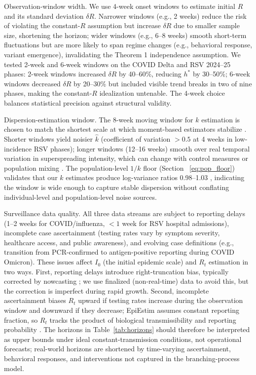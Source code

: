 \documentclass[review]{elsarticle}
\theoremstyle{plain}
\theoremstyle{definition}
\begin{document}
Observation-window width. We use 4-week onset windows to estimate initial $R$ and its standard deviation $\delta R$. Narrower windows (e.g., 2 weeks) reduce the risk of violating the constant-$R$ assumption but increase $\delta R$ due to smaller sample size, shortening the horizon; wider windows (e.g., 6--8 weeks) smooth short-term fluctuations but are more likely to span regime changes (e.g., behavioral response, variant emergence), invalidating the Theorem 1 independence assumption. We tested 2-week and 6-week windows on the COVID Delta and RSV 2024--25 phases: 2-week windows increased $\delta R$ by 40--60\%, reducing $h^*$ by 30--50\%; 6-week windows decreased $\delta R$ by 20--30\% but included visible trend breaks in two of nine phases, making the constant-$R$ idealization untenable. The 4-week choice balances statistical precision against structural validity.

Dispersion-estimation window. The 8-week moving window for $k$ estimation is chosen to match the shortest scale at which moment-based estimators stabilize \citep{endo2020overdispersion}. Shorter windows yield noisier $\hat{k}$ (coefficient of variation $>0.5$ at 4 weeks in low-incidence RSV phases); longer windows (12--16 weeks) smooth over real temporal variation in superspreading intensity, which can change with control measures or population mixing \citep{adam2020clustering, lloyd-smith2005superspreading}. The population-level $1/k$ floor (Section~
\ref{eq:pop_floor}) validates that our $k$ estimates produce log-variance ratios 0.98--1.03 , indicating the window is wide enough to capture stable dispersion without conflating individual-level and population-level noise sources.

Surveillance data quality. All three data streams are subject to reporting delays (1--2 weeks for COVID/influenza, $<1$ week for RSV hospital admissions), incomplete case ascertainment (testing rates vary by symptom severity, healthcare access, and public awareness), and evolving case definitions (e.g., transition from PCR-confirmed to antigen-positive reporting during COVID Omicron). These issues affect $I_0$ (the initial epidemic scale) and $R_t$ estimation in two ways. First, reporting delays introduce right-truncation bias, typically corrected by nowcasting \citep{bastos2019nowcasting}; we use finalized (non-real-time) data to avoid this, but the correction is imperfect during rapid growth. Second, incomplete ascertainment biases $R_t$ upward if testing rates increase during the observation window and downward if they decrease; EpiEstim assumes constant reporting fraction, so $R_t$ tracks the product of biological transmissibility and reporting probability \citep{gostic2020practical}. The horizons in Table~\ref{tab:horizons} should therefore be interpreted as upper bounds under ideal constant-transmission conditions, not operational forecasts; real-world horizons are shortened by time-varying ascertainment, behavioral responses, and interventions not captured in the branching-process model.
\end{document}

